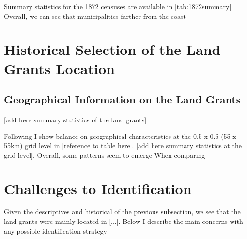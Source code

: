 \documentclass{article}
\begin{document}
Summary statistics for the 1872 censuses are available in \autoref{tab:1872summary}. Overall, we can see that municipalities farther from the coast 

\section{Historical Selection of the Land Grants Location}

\subsection{Geographical Information on the Land Grants}

[add here summary statistics of the land grants]

Following \textcite{Lowes2021-ww} I show balance on geographical characteristics at the 0.5 x 0.5 (55 x 55km) grid level in [reference to table here]. [add here summary statistics at the grid level]. 
Overall, some patterns seem to emerge 
When comparing 

\section{Challenges to Identification}

Given the descriptives and historical  of the previous subsection, we see that the land grants were mainly located in [...]. 
Below I describe the main concerns with any possible identification strategy:
\end{document}
